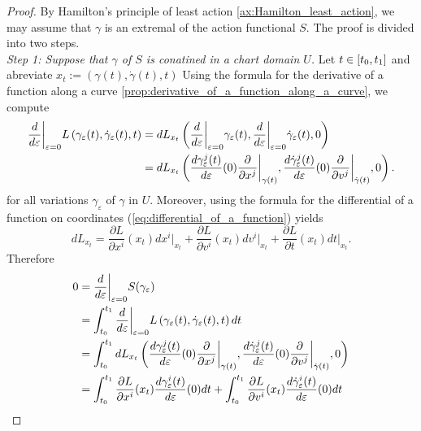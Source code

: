 \begin{proof}
	By Hamilton's principle of least action \ref{ax:Hamilton_least_action}, we may assume that $\gamma$ is an extremal of the action functional $S$. The proof is divided into two steps.\\
	\emph{Step 1: Suppose that $\gamma$ of $S$ is conatined in a chart domain $U$.} Let $t \in \intcc[0]{t_0,t_1}$ and abreviate $x_t := (\gamma(t),\dot{\gamma}(t),t)$ Using the formula for the derivative of a function along a curve \ref{prop:derivative_of_a_function_along_a_curve}, we compute
	\begin{align*}
		\frac{d}{d\varepsilon}\bigg\vert_{\varepsilon = 0} L\del[0]{\gamma_\varepsilon(t),\dot{\gamma}_\varepsilon(t),t} &= dL_{x_t}\del[3]{\frac{d}{d\varepsilon}\bigg\vert_{\varepsilon = 0}\gamma_\varepsilon(t),\frac{d}{d\varepsilon}\bigg\vert_{\varepsilon = 0}\dot{\gamma}_\varepsilon(t),0}\\
		&= dL_{x_t}\del[3]{\frac{d\gamma_\varepsilon^j(t)}{d\varepsilon}(0)\frac{\partial}{\partial x^j}\bigg\vert_{\gamma(t)},\frac{d\dot{\gamma}_\varepsilon^j(t)}{d\varepsilon}(0)\frac{\partial}{\partial v^j}\bigg\vert_{\dot{\gamma}(t)},0}.
	\end{align*}
	\noindent for all variations $\gamma_\varepsilon$ of $\gamma$ in $U$. Moreover, using the formula for the differential of a function on coordinates (\ref{eq:differential_of_a_function}) yields
	\begin{equation*}
		dL_{x_t} = \frac{\partial L}{\partial x^i}(x_t) dx^i\vert_{x_t} + \frac{\partial L}{\partial v^i}(x_t) dv^i\vert_{x_t} + \frac{\partial L}{\partial t}(x_t)dt\vert_{x_t}.
	\end{equation*}
	Therefore
	\begin{align*}
		0 &= \frac{d}{d\varepsilon}\bigg\vert_{\varepsilon = 0} S(\gamma_\varepsilon)\\
		&= \int_{t_0}^{t_1} \frac{d}{d\varepsilon}\bigg\vert_{\varepsilon = 0} L\del[0]{\gamma_\varepsilon(t),\dot{\gamma}_\varepsilon(t),t} dt\\
		&= \int_{t_0}^{t_1} dL_{x_t}\del[3]{\frac{d\gamma_\varepsilon^j(t)}{d\varepsilon}(0)\frac{\partial}{\partial x^j}\bigg\vert_{\gamma(t)},\frac{d\dot{\gamma}_\varepsilon^j(t)}{d\varepsilon}(0)\frac{\partial}{\partial v^j}\bigg\vert_{\dot{\gamma}(t)},0}\\
		&= \int_{t_0}^{t_1} \frac{\partial L}{\partial x^i}(x_t)\frac{d\gamma_\varepsilon^i(t)}{d\varepsilon}(0)dt + \int_{t_0}^{t_1}\frac{\partial L}{\partial v^i}(x_t)\frac{d\dot{\gamma}_\varepsilon^i(t)}{d\varepsilon}(0)dt\\

\end{align*}
\end{proof}
